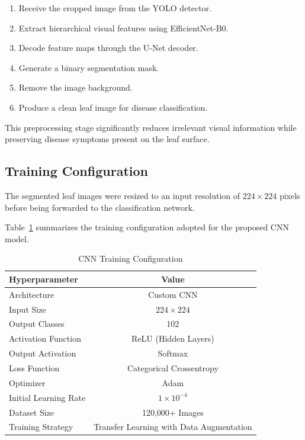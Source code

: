 \begin{enumerate}[leftmargin=*,label=\textbf{S\arabic*.}]

\item Receive the cropped image from the YOLO detector.

\item Extract hierarchical visual features using EfficientNet-B0.

\item Decode feature maps through the U-Net decoder.

\item Generate a binary segmentation mask.

\item Remove the image background.

\item Produce a clean leaf image for disease classification.

\end{enumerate}

This preprocessing stage significantly reduces irrelevant visual information while preserving disease symptoms present on the leaf surface.

\subsection{Training Configuration}

The segmented leaf images were resized to an input resolution of
\(224 \times 224\) pixels before being forwarded to the classification network.

Table~\ref{tab:cnn_parameters} summarizes the training configuration adopted for the proposed CNN model.

\begin{table}[H]
\centering
\caption{CNN Training Configuration}
\label{tab:cnn_parameters}
\renewcommand{\arraystretch}{1.35}
\begin{tabular}{lc}
\toprule
\textbf{Hyperparameter} & \textbf{Value}\\
\midrule
Architecture & Custom CNN\\
Input Size & $224 \times 224$\\
Output Classes & 102\\
Activation Function & ReLU (Hidden Layers)\\
Output Activation & Softmax\\
Loss Function & Categorical Crossentropy\\
Optimizer & Adam\\
Initial Learning Rate & $1 \times 10^{-4}$\\
Dataset Size & 120,000+ Images\\
Training Strategy & Transfer Learning with Data Augmentation\\
\bottomrule
\end{tabular}
\end{table}

